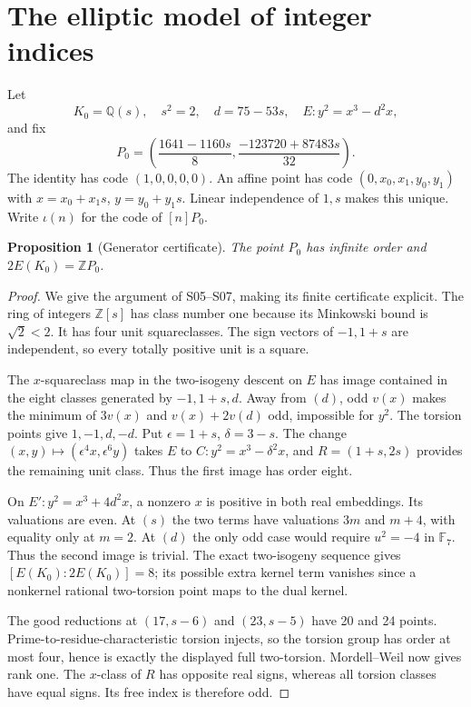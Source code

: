 \documentclass[11pt]{article}
\newtheorem{proposition}[theorem]{Proposition}
\theoremstyle{definition}
\theoremstyle{remark}
\newcommand{\Q}{\mathbb Q}
\newcommand{\Z}{\mathbb Z}
\newcommand{\F}{\mathbb F}
\begin{document}
\section{The elliptic model of integer indices}\label{sec:model}
Let
\[
 K_0=\Q(s),\quad s^2=2,\quad d=75-53s,\quad E:y^2=x^3-d^2x,
\]
and fix
\[
 P_0=\left(\frac{1641-1160s}{8},\frac{-123720+87483s}{32}\right).
\]
The identity has code $(1,0,0,0,0)$. An affine point has code
$(0,x_0,x_1,y_0,y_1)$ with $x=x_0+x_1s$, $y=y_0+y_1s$.
Linear independence of $1,s$ makes this unique. Write $\iota(n)$ for
the code of $[n]P_0$.

\begin{proposition}[Generator certificate]\label{prop:generator}
The point $P_0$ has infinite order and $2E(K_0)=\Z P_0$.
\end{proposition}
\begin{proof}
We give the argument of S05--S07, making its finite certificate explicit.
The ring of integers $\Z[s]$ has class number one because its Minkowski
bound is $\sqrt2<2$. It has four unit squareclasses. The sign vectors
of $-1,1+s$ are independent, so every totally positive unit is a square.

The $x$-squareclass map in the two-isogeny descent on $E$ has image
contained in the eight classes generated by $-1,1+s,d$. Away from $(d)$,
odd $v(x)$ makes the minimum of $3v(x)$ and $v(x)+2v(d)$ odd, impossible
for $y^2$. The torsion points give $1,-1,d,-d$. Put $\epsilon=1+s$,
$\delta=3-s$. The change $(x,y)\mapsto(\epsilon^4x,\epsilon^6y)$ takes
$E$ to $C:y^2=x^3-\delta^2x$, and $R=(1+s,2s)$ provides the remaining
unit class. Thus the first image has order eight.

On $E':y^2=x^3+4d^2x$, a nonzero $x$ is positive in both real embeddings.
Its valuations are even. At $(s)$ the two terms have valuations $3m$
and $m+4$, with equality only at $m=2$. At $(d)$ the only odd case
would require $u^2=-4$ in $\F_7$. Thus the second image is trivial.
The exact two-isogeny sequence gives $[E(K_0):2E(K_0)]=8$; its possible
extra kernel term vanishes since a nonkernel rational two-torsion point
maps to the dual kernel.

The good reductions at $(17,s-6)$ and $(23,s-5)$ have 20 and 24 points.
Prime-to-residue-characteristic torsion injects, so the torsion group
has order at most four, hence is exactly the displayed full two-torsion. Mordell--Weil now gives rank one.
The $x$-class of $R$ has opposite real signs, whereas all torsion classes
have equal signs. Its free index is therefore odd.


\end{proof}
\end{document}
